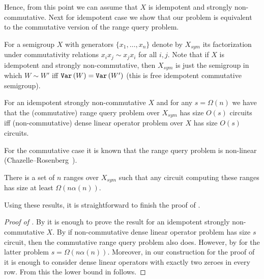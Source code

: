 \documentclass{toc}
\begin{document}
Hence, from this point we can assume that $X$ is idempotent and strongly
non-commutative. Next for idempotent case we show that our problem is equivalent
to the commutative version of the range query problem.

For a semigroup $X$ with generators $\{x_1,\ldots, x_n\}$ denote by $X_{sym}$
its factorization under commutativity relations
$x_i x_j \sim x_j x_i$ for all $i,j$. Note that if $X$ is idempotent and
strongly non-commutative, then $X_{sym}$ is just the semigroup in which
$W \sim W'$ iff $\texttt{Var}\,(W)=\texttt{Var}\,(W')$ (this is free idempotent commutative
semigroup).

\begin{theorem}\label{thm:equivalence}
For an idempotent strongly non-commutative $X$ and for any $s=\Omega(n)$ we have
that the (commutative)
range query problem
over $X_{sym}$ has size $O(s)$ circuits
iff (non-commutative) dense linear operator problem over $X$ has size $O(s)$
circuits.
\end{theorem}

%
For the commutative case it is known that
the range query
problem is non-linear
(Chazelle--Rosenberg~\cite{DBLP:journals/ijcga/ChazelleR91}).  %
\begin{theorem}\label{thm:chazelle}
	There is a set of $n$ ranges over $X_{sym}$ such that any circuit
	computing these ranges has size at least $\Omega(n \alpha(n))$.
\end{theorem}

Using these results, it is straightforward to finish the proof of
.

\begin{proof}[Proof of {}]

By  it is enough to prove the result for an idempotent strongly non-commutative $X$.
By  if non-commutative dense linear
operator problem has size $s$ circuit, then the commutative
range query
problem also does. However, by  for the latter problem $s=\Omega(n \alpha(n))$.
Moreover, in our construction for the proof of  it
is enough to consider dense linear operators with exactly two zeroes in every
row. From this the lower bound in  follows.
\end{proof}
\end{document}
